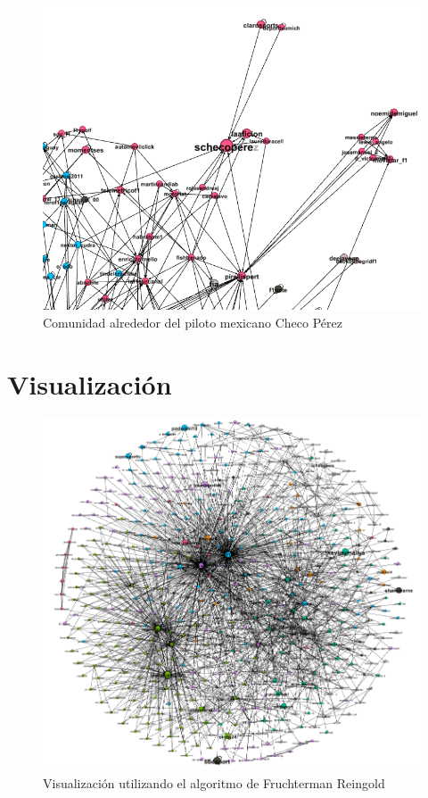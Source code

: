 \begin{figure}[H]
	\centering
	\includegraphics[width=14cm]{img/comunidad-perez}
	\caption{Comunidad alrededor del piloto mexicano Checo Pérez}
	\label{fig:comunidad-perez}
\end{figure}

\section{Visualización}

\begin{figure}[H]
	\centering
	\includegraphics[width=14cm]{img/fruchterman-reingold}
	\caption{Visualización utilizando el algoritmo de Fruchterman Reingold}
	\label{fig:fruchterman-reingold}
\end{figure}

